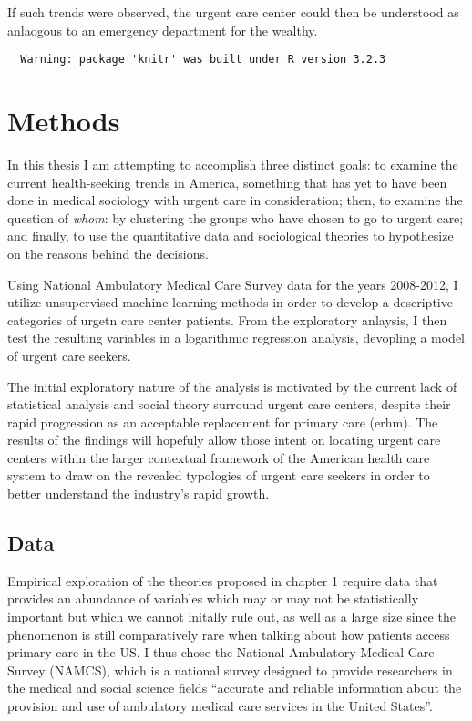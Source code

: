 \documentclass[12pt,twoside]{reedthesis}
\begin{document}
  If such trends were observed, the urgent care center could then be
  understood as anlaogous to an emergency department for the wealthy.
  
  \onehalfspacing
  
  \begin{verbatim}
  Warning: package 'knitr' was built under R version 3.2.3
  \end{verbatim}
  
  \chapter{Methods}\label{methods}
  
  In this thesis I am attempting to accomplish three distinct goals: to
  examine the current health-seeking trends in America, something that has
  yet to have been done in medical sociology with urgent care in
  consideration; then, to examine the question of \textit{whom}: by
  clustering the groups who have chosen to go to urgent care; and finally,
  to use the quantitative data and sociological theories to hypothesize on
  the reasons behind the decisions.
  
  Using National Ambulatory Medical Care Survey data for the years
  2008-2012, I utilize unsupervised machine learning methods in order to
  develop a descriptive categories of urgetn care center patients. From
  the exploratory anlaysis, I then test the resulting variables in a
  logarithmic regression analysis, devopling a model of urgent care
  seekers.
  
  The initial exploratory nature of the analysis is motivated by the
  current lack of statistical analysis and social theory surround urgent
  care centers, despite their rapid progression as an acceptable
  replacement for primary care (erhm). The results of the findings will
  hopefuly allow those intent on locating urgent care centers within the
  larger contextual framework of the American health care system to draw
  on the revealed typologies of urgent care seekers in order to better
  understand the industry's rapid growth.
  
  \section{Data}\label{data}
  
  Empirical exploration of the theories proposed in chapter 1 require data
  that provides an abundance of variables which may or may not be
  statistically important but which we cannot initally rule out, as well
  as a large size since the phenomenon is still comparatively rare when
  talking about how patients access primary care in the US. I thus chose
  the National Ambulatory Medical Care Survey (NAMCS), which is a national
  survey designed to provide researchers in the medical and social science
  fields ``accurate and reliable information about the provision and use
  of ambulatory medical care services in the United States''.
  
\end{document}
